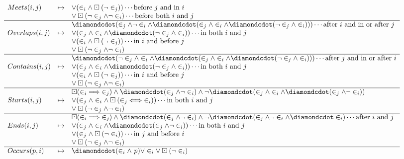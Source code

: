 \documentclass{article}
\begin{document}
\begin{enumerate}
$$\begin{array}{lcl}
	Meets(i, j)   & \mapsto & \lor (\in_i \land \PastG (\neg \in_j)) \cdots \text{before $j$ and in $i$}      \\
	              &         & \lor \PastG (\neg \in_j \land \neg \in_i) \cdots \text{before both $i$ and $j$} \\ \hline
	              &         & \PastF(\in_j\land\neg\in_i\land\PastF(\in_j\land\in_i\land\PastF(\neg\in_j\land\in_i))) \cdots \text{after $i$ and in or after $j$} \\
	Overlaps(i,j) & \mapsto & \lor (\in_j\land\in_i\land\PastF(\neg\in_j\land\in_i)) \cdots \text{in both $i$ and $j$} \\
	              &         & \lor (\in_i\land \PastG(\neg\in_j)) \cdots \text{in $i$ and before $j$}                 \\
	              &         & \lor \PastG (\neg \in_j \land \neg \in_i)                                      \\ \hline
	              &         & \PastF(\neg\in_j\land\in_i\land\PastF(\in_j\land\in_i\land\PastF(\neg\in_j\land\in_i))) \cdots \text{after $j$ and in or after $i$} \\
	Contains(i,j) & \mapsto & \lor (\in_j\land\in_i\land\PastF(\neg\in_j\land\in_i)) \cdots \text{in both $i$ and $j$} \\
	              &         & \lor (\in_i\land \PastG(\neg\in_j)) \cdots \text{in $i$ and before $j$}        \\
	              &         & \lor \PastG (\neg \in_j \land \neg \in_i)                                      \\ \hline
	              &         & \PastG (\in_i \implies \in_j) \land \PastF(\in_j \land \neg \in_i) \land \neg \PastF(
	              \in_j \land \in_i \land \PastF(\in_j \land \neg \in_i)) \\
	Starts(i,j)   & \mapsto & \lor (\in_j \land \in_i \land \PastG(\in_j \iff \in_i)) \cdots \text{in both $i$ and $j$}\\
	              &         & \lor \PastG (\neg \in_j \land \neg \in_i)                                      \\ \hline
	              &         & \PastG (\in_i \implies \in_j) \land \PastF(\in_j \land \neg \in_i) \land \neg \PastF(
	              	              \in_j \land \neg \in_i \land \PastF\in_i) \cdots \text{after $i$ and $j$} \\
	Ends(i,j)     & \mapsto & \lor (\in_j\land\in_i\land\PastF(\in_j\land\neg\in_i)) \cdots \text{in both $i$ and $j$} \\
	              &         & \lor (\in_j\land \PastG(\neg\in_i)) \cdots \text{in $j$ and before $i$}        \\
	              &         & \lor \PastG (\neg \in_j \land \neg \in_i)                                      \\ \hline
	Occurs(p, i)  & \mapsto & \PastF (\in_i \land\ p) \lor \in_i \lor \PastG(\neg \in_i)  \\
\end{array}
$$


\end{enumerate}
\end{document}

